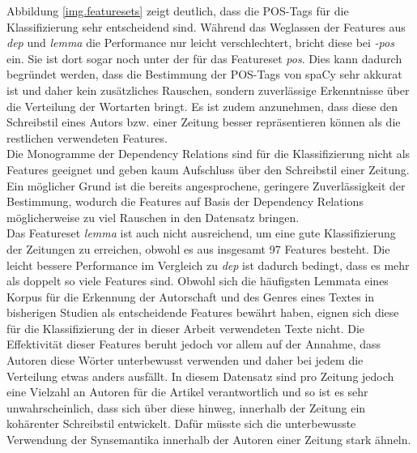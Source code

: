 Abbildung \ref{img.featuresets} zeigt deutlich, dass die POS-Tags für die Klassifizierung sehr entscheidend sind. Während das Weglassen der Features aus \textit{dep} und \textit{lemma} die Performance nur leicht verschlechtert, bricht diese bei \textit{-pos} ein. Sie ist dort sogar noch unter der für das Featureset \textit{pos}. Dies kann dadurch begründet werden, dass die Bestimmung der POS-Tags von spaCy sehr akkurat ist und daher kein zusätzliches Rauschen, sondern zuverlässige Erkenntnisse über die Verteilung der Wortarten bringt. Es ist zudem anzunehmen, dass diese den Schreibstil eines Autors bzw. einer Zeitung besser repräsentieren können als die restlichen verwendeten Features.\\
Die Monogramme der Dependency Relations sind für die Klassifizierung nicht als Features geeignet und geben kaum Aufschluss über den Schreibstil einer Zeitung. Ein möglicher Grund ist die bereits angesprochene, geringere Zuverlässigkeit der Bestimmung, wodurch die Features auf Basis der Dependency Relations möglicherweise zu viel Rauschen in den Datensatz bringen.\\
Das Featureset \textit{lemma} ist auch nicht ausreichend, um eine gute Klassifizierung der Zeitungen zu erreichen, obwohl es aus insgesamt 97 Features besteht. Die leicht bessere Performance im Vergleich zu \textit{dep} ist dadurch bedingt, dass es mehr als doppelt so viele Features sind. Obwohl sich die häufigsten Lemmata eines Korpus für die Erkennung der Autorschaft und des Genres eines Textes in bisherigen Studien als entscheidende Features bewährt haben, eignen sich diese für die Klassifizierung der in dieser Arbeit verwendeten Texte nicht. Die Effektivität dieser Features beruht jedoch vor allem auf der Annahme, dass Autoren diese Wörter unterbewusst verwenden und daher bei jedem die Verteilung etwas anders ausfällt. In diesem Datensatz sind pro Zeitung jedoch eine Vielzahl an Autoren für die Artikel verantwortlich und so ist es sehr unwahrscheinlich, dass sich über diese hinweg, innerhalb der Zeitung ein kohärenter Schreibstil entwickelt. Dafür müsste sich die unterbewusste Verwendung der Synsemantika innerhalb der Autoren einer Zeitung stark ähneln.


